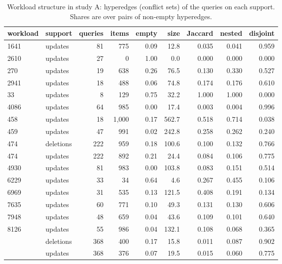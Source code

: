 
\begin{table}[tbp]
  \centering
  \footnotesize
  \setlength{\tabcolsep}{2.5pt}
  \caption{Workload structure in study A: hyperedges (conflict sets) of the queries on each support. Shares are over pairs of non-empty hyperedges.}
  \label{tab:app-workloads}
  \begin{tabular}{@{}llrrrrrrr@{}}
    \toprule
    workload & support & queries & items & empty & size & Jaccard & nested & disjoint \\
    \midrule
    1641 & updates & 81 & 775 & 0.09 & 12.8 & 0.035 & 0.041 & 0.959 \\
    2610 & updates & 27 & 0 & 1.00 & 0.0 & 0.000 & 0.000 & 0.000 \\
    270 & updates & 19 & 638 & 0.26 & 76.5 & 0.130 & 0.330 & 0.527 \\
    2941 & updates & 18 & 488 & 0.06 & 74.8 & 0.174 & 0.176 & 0.610 \\
    33 & updates & 8 & 129 & 0.75 & 32.2 & 1.000 & 1.000 & 0.000 \\
    4086 & updates & 64 & 985 & 0.00 & 17.4 & 0.003 & 0.004 & 0.996 \\
    458 & updates & 18 & 1,000 & 0.17 & 562.7 & 0.518 & 0.714 & 0.038 \\
    459 & updates & 47 & 991 & 0.02 & 242.8 & 0.258 & 0.262 & 0.240 \\
    474 & deletions & 222 & 959 & 0.18 & 100.6 & 0.100 & 0.132 & 0.766 \\
    474 & updates & 222 & 892 & 0.21 & 24.4 & 0.084 & 0.106 & 0.775 \\
    4930 & updates & 81 & 983 & 0.00 & 103.8 & 0.083 & 0.151 & 0.514 \\
    6229 & updates & 33 & 34 & 0.64 & 4.6 & 0.267 & 0.455 & 0.106 \\
    6969 & updates & 31 & 535 & 0.13 & 121.5 & 0.408 & 0.191 & 0.134 \\
    7635 & updates & 60 & 771 & 0.10 & 49.3 & 0.131 & 0.130 & 0.606 \\
    7948 & updates & 48 & 659 & 0.04 & 43.6 & 0.109 & 0.101 & 0.640 \\
    8126 & updates & 55 & 986 & 0.04 & 132.1 & 0.108 & 0.068 & 0.365 \\
    \tpch{} & deletions & 368 & 400 & 0.17 & 15.8 & 0.011 & 0.087 & 0.902 \\
    \tpch{} & updates & 368 & 376 & 0.07 & 19.5 & 0.015 & 0.060 & 0.775 \\
    \bottomrule
  \end{tabular}
\end{table}

